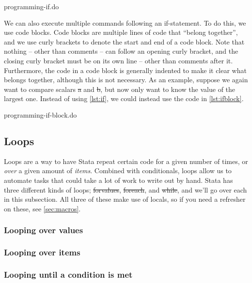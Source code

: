 \begin{listing}[tbp]
\caption{programming-if.do}\label{lst:if}
\end{listing}

We can also execute multiple commands following an if-statement.
To do this, we use code blocks.
Code blocks are multiple lines of code that ``belong together'',
and we use curly brackets to denote the start and end of a code block.
Note that nothing -- other than comments -- can follow an opening curly bracket,
and the closing curly bracket must be on its own line --
other than comments after it.
Furthermore,
the code in a code block is generally indented to make it clear what belongs together,
although this is not necessary.
As an example,
suppose we again want to compare scalars \st{a} and \st{b},
but now only want to know the value of the largest one.
Instead of using \cref{lst:if},
we could instead use the code in \cref{lst:ifblock}.

\begin{listing}[tbp]
\caption{programming-if-block.do}\label{lst:ifblock}
\end{listing}

\subsection{Loops}

Loops are a way to have Stata repeat certain code for a given number of times,
or \emph{over} a given amount of \emph{items}.
Combined with conditionals,
loops allow us to automate tasks that could take a lot of work to write out by hand.
Stata has three different kinds of loops;
\st{forvalues}, \st{foreach}, and \st{while},
and we'll go over each in this subsection.
All three of these make use of locals,
so if you need a refresher on these,
see \cref{sec:macros}.

\subsubsection{Looping over values}


\subsubsection{Looping over items}


\subsubsection{Looping until a condition is met}
